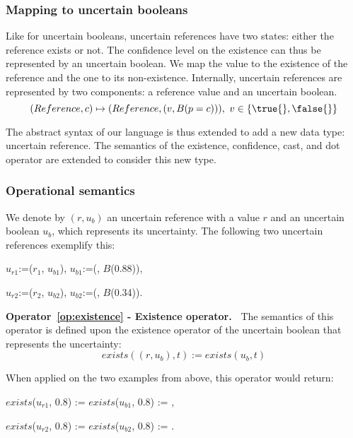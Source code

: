 \subsubsection{Mapping to uncertain booleans}
Like for uncertain booleans, uncertain references have two states: either the reference exists or not.
The confidence level on the existence can thus be represented by an uncertain boolean.
We map the \true{} value to the existence of the reference and the \false{} one to its non-existence.
Internally, uncertain references are represented by two components: a reference value and an uncertain boolean.
$$(Reference, c) \mapsto (Reference, (v, B(p=c))),\ v \in \{\true{}, \false{}\}$$

The abstract syntax of our language is thus extended to add a new data type: uncertain reference.
The semantics of the existence, confidence, cast, and dot operator are extended to consider this new type.

\subsubsection{Operational semantics}
We denote by $(r, u_b)$ an uncertain reference with a value $r$ and an uncertain boolean $u_b$, which represents its uncertainty.
The following two uncertain references exemplify this:
\begin{itemize*}
    \item[] $u_{r1}$:=($r_1$, $u_{b1}$), $u_{b1}$:=(\true{}, $B$(0.88)),
    \item[] $u_{r2}$:=($r_2$, $u_{b2}$), $u_{b2}$:=(\true{}, $B$(0.34)).
\end{itemize*}

\bigskip

\noindent\textbf{Operator~\ref{op:existence} - Existence operator.~}
The semantics of this operator is defined upon the existence operator of the uncertain boolean that represents the uncertainty:
$$exists((r, u_b), t) := exists(u_b, t)$$

When applied on the two examples from above, this operator would return:
\begin{itemize*}
    \item[] $exists$($u_{r1}$, 0.8) := $exists$($u_{b1}$, 0.8) := \true{},
    \item[] $exists$($u_{r2}$, 0.8) := $exists$($u_{b2}$, 0.8) := \false{}.
\end{itemize*}

